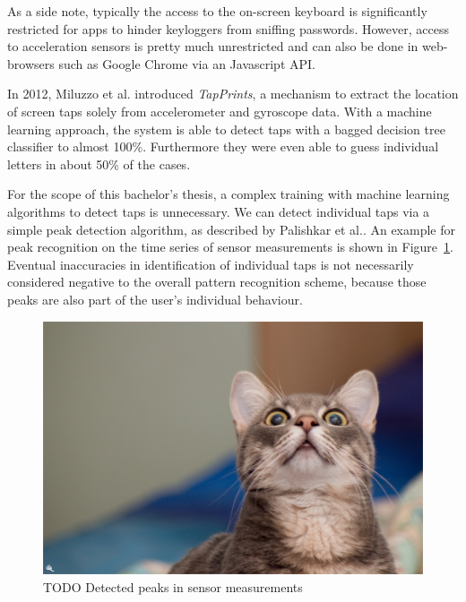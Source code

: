 As a side note, typically the access to the on-screen keyboard is significantly restricted for \glspl{app} to hinder keyloggers from sniffing passwords. However, access to acceleration sensors is pretty much unrestricted and can also be done in web-browsers such as Google Chrome via an Javascript API\cite{devicemotionjavascript}.

In 2012, Miluzzo et al.\cite{miluzzo2012tapprints} introduced \emph{TapPrints}, a mechanism to extract the location of screen taps solely from accelerometer and gyroscope data. With a machine learning approach, the system is able to detect taps with a bagged decision tree classifier to almost 100\%. Furthermore they were even able to guess individual letters in about 50\% of the cases.

For the scope of this bachelor's thesis, a complex training with machine learning algorithms to detect taps is unnecessary. We can detect individual taps via a simple peak detection algorithm, as described by Palishkar et al.\cite{palshikar2009simple}. An example for peak recognition on the time series of sensor measurements is shown in Figure~\ref{fig:peakdetection}. Eventual inaccuracies in identification of individual taps is not necessarily considered negative to the overall pattern recognition scheme, because those peaks are also part of the user's individual behaviour.

\begin{figure}
    \centering
    \includegraphics[width=\linewidth]{figures/lucifero_lolcat_by_fraterorion-d4q5ol0.jpg}
    \caption{TODO Detected peaks in sensor measurements}
    \label{fig:peakdetection}
\end{figure}

